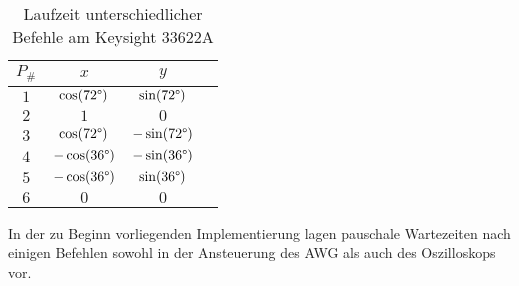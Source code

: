 \documentclass[../Report.tex]{subfiles}
\begin{document}
\begin{table}[H]
\begin{subtable}[t]{.35\linewidth}
\label{ta}
\begin{tabular}[t]{ | c | c | c | c | } 
  \hline
    $P_{\#}$ & $x$ & $y$ \\ 
  \hline
    $1$ & $\cos(72\degree)$ 	& $\sin(72\degree)$ \\ 
  \hline
    $2$ & $1$ 				& $0$ \\
  \hline
    $3$ & $\cos(72\degree)$ 	& $-\sin(72\degree)$ \\
  \hline
    $4$ & $-\cos(36\degree)$ & $-\sin(36\degree)$ \\
  \hline
    $5$ & $-\cos(36\degree)$ & $\sin(36\degree)$ \\
  \hline
    $6$ & $0$ 				& $0$ \\  
  \hline  
\end{tabular}
\end{subtable}
\caption{Laufzeit unterschiedlicher Befehle am Keysight 33622A}
\label{tab:vorg.gerate.runtime}
\end{table}

In der zu Beginn vorliegenden Implementierung lagen pauschale Wartezeiten nach einigen Befehlen sowohl in der Ansteuerung des AWG als auch des Oszilloskops vor. 
\end{document}
